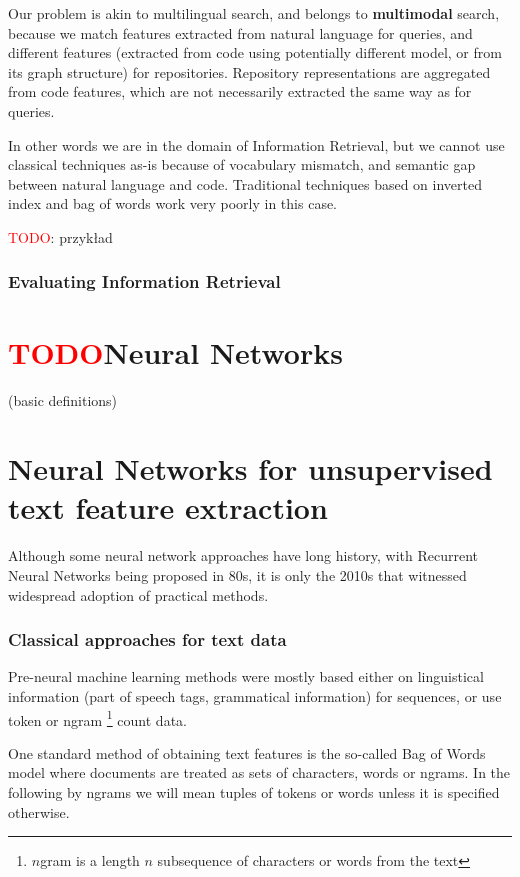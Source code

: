 \documentclass[longabstract,mgr,english]{iithesis}
\newcommand{\TODO}{\textcolor{red}{\huge{TODO}}}
\begin{document}
Our problem is akin to multilingual search, and belongs to \textbf{multimodal} search, because we match features extracted from natural language for queries, and different features (extracted from code using potentially different model, or from its graph structure) for repositories. Repository representations are aggregated from code features, which are not necessarily extracted the same way as for queries.

In other words we are in the domain of Information Retrieval, but we cannot use classical techniques as-is because of vocabulary mismatch, and semantic gap between natural language and code. Traditional techniques based on inverted index and bag of words work very poorly in this case.

\TODO : przykład

\subsubsection{Evaluating Information Retrieval}

\section{\TODO Neural Networks}


(basic definitions)

\section{Neural Networks for unsupervised text feature extraction}


Although some neural network approaches have long history, with Recurrent Neural Networks being proposed in 80s, it is only the 2010s that witnessed widespread adoption of practical methods. 

\subsubsection{Classical approaches for text data}


Pre-neural machine learning methods were mostly based either on linguistical information (part of speech tags, grammatical information) for sequences,
or use token or ngram \footnote{$n$gram is a length $n$ subsequence of characters or words from the text} count data.

One standard method of obtaining text features is the so-called Bag of Words model where documents are treated as sets of characters, words or ngrams. In the following by ngrams we will mean tuples of tokens or words unless it is specified otherwise.
\end{document}
